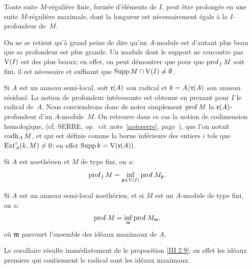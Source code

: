 \enlargethispage{1.2\baselineskip}%
\begin{corollaire} \label{III.2.6}
Toute suite $M$-r\'eguli\`ere finie, form\'ee d'\'el\'ements de $I$, peut \^etre prolong\'ee en une suite $M$-r\'eguli\`ere maximale, dont la longueur est n\'ecessairement \'egale \`a la $I$-profondeur de~$M$.
\end{corollaire}

\begin{remarque} \label{III.2.7}
On ne se retient qu'\`a grand peine de dire qu'un $A$-module est d'autant plus beau que sa profondeur est plus grande. Un module dont le support ne rencontre pas $\operatorname{V} (I)$ est des plus beaux; en effet, on peut d\'emontrer que pour que $\operatorname{prof}_I M$ soit fini, il est n\'ecessaire et suffisant que $\operatorname{Supp} M \cap \operatorname{V}(I) \neq \emptyset$.
\end{remarque}

\begin{remarque} \label{III.2.8}
Si $A$ est un anneau semi-local, soit $\mathfrak{r}(A)$ son radical et $k=A/\mathfrak{r}(A)$ son anneau r\'esiduel. La notion de profondeur int\'eressante est obtenue en prenant pour $I$ le radical de~$A$. Nous conviendrons donc de noter simplement $\operatorname{prof} M$ la $\mathfrak{r}(A)$-profondeur d'un $A$-module~$M$. On retrouve dans ce cas la notion de \og codimension homologique\fg, (cf. SERRE, \textit{op.\, cit.} note~\eqref{noteserre}, page~\pageref{noteserre}), que l'on notait $\operatorname{codh}_A M$, et qui est d\'efinie comme la borne inf\'erieure des entiers $i$ tels que $\operatorname{Ext}_A^i(k, M)\neq 0$; en effet $\operatorname{Supp} k = \operatorname{V}(\mathfrak{r}(A))$.
\end{remarque}

\begin{proposition} \label{III.2.9}
Si $A$ est noeth\'erien et $M$ de type fini, on a:
\[
\operatorname{prof}_I M = \inf_{\mathfrak{p} \in \operatorname{V} (I)} \operatorname{prof} M_{\mathfrak{p}}.
\]
\end{proposition}

\begin{corollaire} \label{III.2.10}
Si $A$ est un anneau semi-local noeth\'erien, et si $M$ est un $A$-module de type fini, on a:
\[
\operatorname{prof} M = \inf_{\mathfrak{m}} \operatorname{prof} M_{\mathfrak{m}},
\]
o\`u $\mathfrak{m} $ parcourt l'ensemble des id\'eaux maximaux de $A$.
\end{corollaire}

Le corollaire r\'esulte imm\'ediatement de le proposition \ref{III.2.9}; en effet les id\'eaux premiers qui contiennent le radical sont les id\'eaux maximaux.

